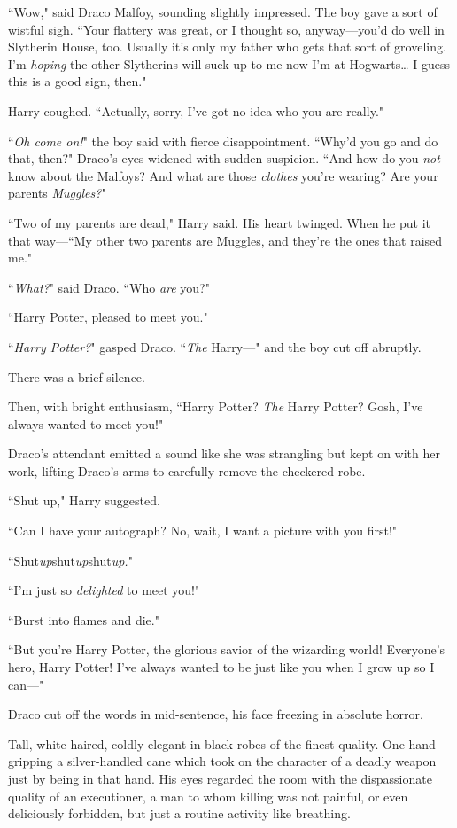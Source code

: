 ``Wow," said Draco Malfoy, sounding slightly impressed. The boy gave a sort of wistful sigh. ``Your flattery was great, or I thought so, anyway—you'd do well in Slytherin House, too. Usually it's only my father who gets that sort of groveling. I'm \emph{hoping} the other Slytherins will suck up to me now I'm at Hogwarts{\ldots} I guess this is a good sign, then."

Harry coughed. ``Actually, sorry, I've got no idea who you are really."

``\emph{Oh come on!}" the boy said with fierce disappointment. ``Why'd you go and do that, then?" Draco's eyes widened with sudden suspicion. ``And how do you \emph{not} know about the Malfoys? And what are those \emph{clothes} you're wearing? Are your parents \emph{Muggles?}"

``Two of my parents are dead," Harry said. His heart twinged. When he put it that way—``My other two parents are Muggles, and they're the ones that raised me."

``\emph{What?}" said Draco. ``Who \emph{are} you?"

``Harry Potter, pleased to meet you."

``\emph{Harry Potter?}" gasped Draco. ``\emph{The} Harry—" and the boy cut off abruptly.

There was a brief silence.

Then, with bright enthusiasm, ``Harry Potter? \emph{The} Harry Potter? Gosh, I've always wanted to meet you!"

Draco's attendant emitted a sound like she was strangling but kept on with her work, lifting Draco's arms to carefully remove the checkered robe.

``Shut up," Harry suggested.

``Can I have your autograph? No, wait, I want a picture with you first!"

``Shut\emph{up}shut\emph{up}shut\emph{up.}"

``I'm just so \emph{delighted} to meet you!"

``Burst into flames and die."

``But you're Harry Potter, the glorious savior of the wizarding world! Everyone's hero, Harry Potter! I've always wanted to be just like you when I grow up so I can—"

Draco cut off the words in mid-sentence, his face freezing in absolute horror.

Tall, white-haired, coldly elegant in black robes of the finest quality. One hand gripping a silver-handled cane which took on the character of a deadly weapon just by being in that hand. His eyes regarded the room with the dispassionate quality of an executioner, a man to whom killing was not painful, or even deliciously forbidden, but just a routine activity like breathing.

